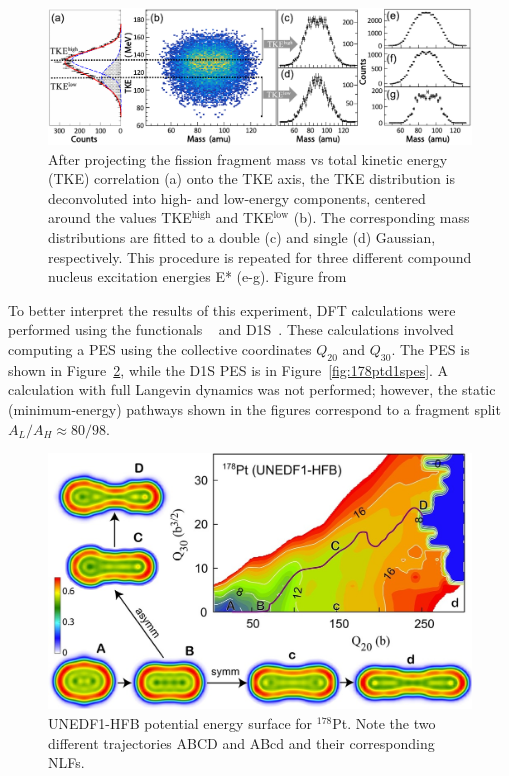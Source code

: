 \begin{figure}
	\centering
	\includegraphics[width=0.95\linewidth]{TeX_files/178Pt_expt_data}
	\caption[$^{178}$Pt experimental data]{After projecting the fission fragment mass vs total kinetic energy (TKE) correlation (a) onto the TKE axis, the TKE distribution is deconvoluted into high- and low-energy components, centered around the values TKE$^\mathrm{high}$ and TKE$^\mathrm{low}$ (b). The corresponding mass distributions are fitted to a double (c) and single (d) Gaussian, respectively. This procedure is repeated for three different compound nucleus excitation energies E* (e-g). Figure from~\cite{Tsekhanovich2019}}
	\label{fig:178ptexptdata}
\end{figure}

To better interpret the results of this experiment, DFT calculations were performed using the functionals {\hfb}~\cite{Schunck2015} and D1S~\cite{Berger1989}. These calculations involved computing a PES using the collective coordinates $Q_{20}$ and $Q_{30}$. The {\hfb} PES is shown in Figure~\ref{fig:178ptunedf1pes}, while the D1S PES is in Figure~\ref{fig:178ptd1spes}. A calculation with full Langevin dynamics was not performed; however, the static (minimum-energy) pathways shown in the figures correspond to a fragment split $A_L/A_H \approx 80/98$.

\begin{figure}
	\centering
	\includegraphics[width=0.7\linewidth]{TeX_files/178Pt_unedf1_pes.jpg}
	\caption[UNEDF1-HFB potential energy surface for $^{178}$Pt]{UNEDF1-HFB potential energy surface for $^{178}$Pt. Note the two different trajectories ABCD and ABcd and their corresponding NLFs.}
	\label{fig:178ptunedf1pes}
\end{figure}

